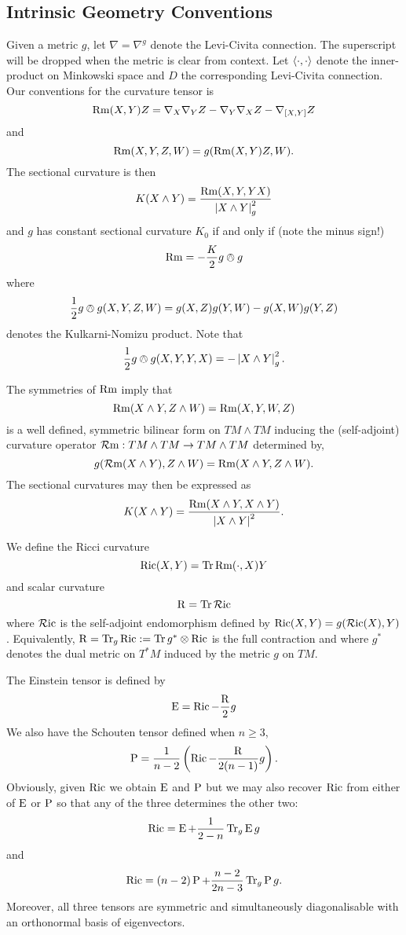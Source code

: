 \documentclass[a4paper, 12pt]{amsart}
\begin{document}
\subsection{Intrinsic Geometry Conventions}
\label{subsec:notation_intrinsic}

Given a metric \(g\), let \(\nabla = \nabla^g\) denote the Levi-Civita connection. The superscript will be dropped when the metric is clear from context. Let \(\left\langle \cdot,\cdot \right\rangle\) denote the inner-product on Minkowski space and \(D\) the corresponding Levi-Civita connection. Our conventions for the curvature tensor is
\[
\operatorname{Rm}(X, Y) Z = \nabla_X \nabla_Y Z - \nabla_Y \nabla_X Z - \nabla_{[X, Y]} Z
\]
and
\[
\operatorname{Rm}(X, Y, Z, W) = g(\operatorname{Rm}(X, Y) Z, W).
\]
The sectional curvature is then
\[
K(X \wedge Y) = \frac{\operatorname{Rm}(X, Y, Y X)}{\left\lvert{X \wedge Y}\right\rvert_g^2}
\]
and \(g\) has constant sectional curvature \(K_0\) if and only if (note the minus sign!)
\[
\operatorname{Rm} = -\frac{K}{2} g \owedge g
\]
where
\[
\frac{1}{2} g \owedge g (X, Y, Z, W) = g(X, Z) g (Y, W) - g(X, W) g(Y, Z)
\]
denotes the Kulkarni-Nomizu product. Note that
\[
\frac{1}{2} g \owedge g (X, Y, Y, X) = -\left\lvert{X \wedge Y}\right\rvert_g^2.
\]

The symmetries of \(\operatorname{Rm}\) imply that
\[
\operatorname{Rm}(X\wedge Y, Z \wedge W) = \operatorname{Rm}(X, Y, W, Z)
\]
is a well defined, symmetric bilinear form on \(TM \wedge TM\) inducing the (self-adjoint) curvature operator \(\operatorname{\mathcal{R}m} : TM \wedge TM \to TM \wedge TM\) determined by,
\[
g(\operatorname{\mathcal{R}m}(X\wedge Y), Z \wedge W) = \operatorname{Rm}(X\wedge Y, Z \wedge W).
\]
The sectional curvatures may then be expressed as
\[
K(X \wedge Y) = \frac{\operatorname{Rm}(X \wedge Y, X \wedge Y)}{\left\lvert{X \wedge Y}\right\rvert^2}.
\]

We define the Ricci curvature
\[
\operatorname{Ric}(X, Y) = \operatorname{Tr} \operatorname{Rm}(\cdot, X) Y
\]
and scalar curvature
\[
\operatorname{R} = \operatorname{Tr} \operatorname{\mathcal{R}ic}
\]
where \(\operatorname{\mathcal{R}ic}\) is the self-adjoint endomorphism defined by \(\operatorname{Ric}(X, Y) = g(\operatorname{\mathcal{R}ic}(X), Y)\). Equivalently, \(\operatorname{R} = \operatorname{Tr}_g \operatorname{Ric} := \operatorname{Tr} g^{\ast} \otimes \operatorname{Ric}\) is the full contraction and where \(g^{\ast}\) denotes the dual metric on \(T^{\ast}M\) induced by the metric \(g\) on \(TM\).

The Einstein tensor is defined by
\[
\operatorname{E} = \operatorname{Ric} - \frac{\operatorname{R}}{2} g
\]
We also have the Schouten tensor defined when \(n \geq 3\),
\[
\operatorname{P} = \frac{1}{n-2} \left(\operatorname{Ric} - \frac{\operatorname{R}}{2(n-1)}g \right).
\]
Obviously, given \(\operatorname{Ric}\) we obtain \(\operatorname{E}\) and \(\operatorname{P}\) but we may also recover \(\operatorname{Ric}\) from either of \(\operatorname{E}\) or \(\operatorname{P}\) so that any of the three determines the other two:
\[
\operatorname{Ric} = \operatorname{E} + \frac{1}{2-n} \operatorname{Tr}_g \operatorname{E} g
\]
and
\[
\operatorname{Ric} = (n-2) \operatorname{P} + \frac{n-2}{2n-3} \operatorname{Tr}_g \operatorname{P} g.
\]
Moreover, all three tensors are symmetric and simultaneously diagonalisable with an orthonormal basis of eigenvectors.
\end{document}
